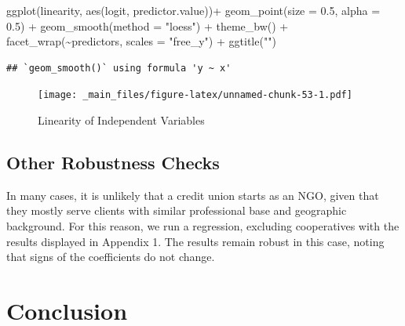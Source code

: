 \documentclass[a4paper,nobind]{templates/ociamthesis}
\newenvironment{Shaded}{\begin{snugshade}}{\end{snugshade}}
\newcommand{\AttributeTok}[1]{\textcolor[rgb]{0.77,0.63,0.00}{#1}}
\newcommand{\FloatTok}[1]{\textcolor[rgb]{0.00,0.00,0.81}{#1}}
\newcommand{\FunctionTok}[1]{\textcolor[rgb]{0.00,0.00,0.00}{#1}}
\newcommand{\NormalTok}[1]{#1}
\newcommand{\SpecialCharTok}[1]{\textcolor[rgb]{0.00,0.00,0.00}{#1}}
\newcommand{\StringTok}[1]{\textcolor[rgb]{0.31,0.60,0.02}{#1}}
\renewenvironment{Shaded}
{
  \vspace{10pt}%
  \begin{snugshade}%
}{%
  \end{snugshade}%
  \vspace{8pt}%
}
\begin{document}
\begin{landscape}
\begin{Shaded}
\begin{Highlighting}[]
\FunctionTok{ggplot}\NormalTok{(linearity, }\FunctionTok{aes}\NormalTok{(logit, predictor.value))}\SpecialCharTok{+}
  \FunctionTok{geom\_point}\NormalTok{(}\AttributeTok{size =} \FloatTok{0.5}\NormalTok{, }\AttributeTok{alpha =} \FloatTok{0.5}\NormalTok{) }\SpecialCharTok{+}
  \FunctionTok{geom\_smooth}\NormalTok{(}\AttributeTok{method =} \StringTok{"loess"}\NormalTok{) }\SpecialCharTok{+} 
  \FunctionTok{theme\_bw}\NormalTok{() }\SpecialCharTok{+} 
  \FunctionTok{facet\_wrap}\NormalTok{(}\SpecialCharTok{\textasciitilde{}}\NormalTok{predictors, }\AttributeTok{scales =} \StringTok{"free\_y"}\NormalTok{) }\SpecialCharTok{+} 
  \FunctionTok{ggtitle}\NormalTok{(}\StringTok{""}\NormalTok{)}
\end{Highlighting}
\end{Shaded}

\begin{verbatim}
## `geom_smooth()` using formula 'y ~ x'
\end{verbatim}

\begin{figure}
\centering
\texttt{[image: \_main\_files/figure-latex/unnamed-chunk-53-1.pdf]}
\caption{\label{fig:unnamed-chunk-53}Linearity of Independent Variables}
\end{figure}

\end{landscape}

\hypertarget{other-robustness-checks}{%
\section{Other Robustness Checks}\label{other-robustness-checks}}

In many cases, it is unlikely that a credit union starts as an NGO, given that they mostly serve clients with similar professional base and geographic background. For this reason, we run a regression, excluding cooperatives with the results displayed in Appendix 1. The results remain robust in this case, noting that signs of the coefficients do not change.

\hypertarget{conclusion}{%
\chapter{Conclusion}\label{conclusion}}
\end{document}

